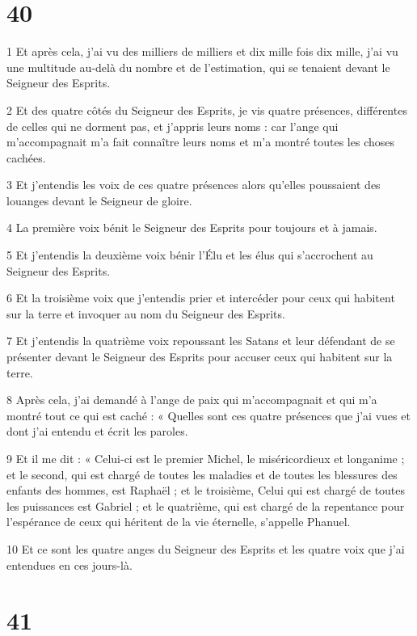 \chapter{40}

\par 1 Et après cela, j'ai vu des milliers de milliers et dix mille fois dix mille, j'ai vu une multitude au-delà du nombre et de l'estimation, qui se tenaient devant le Seigneur des Esprits.
\par 2 Et des quatre côtés du Seigneur des Esprits, je vis quatre présences, différentes de celles qui ne dorment pas, et j'appris leurs noms : car l'ange qui m'accompagnait m'a fait connaître leurs noms et m'a montré toutes les choses cachées.
\par 3 Et j'entendis les voix de ces quatre présences alors qu'elles poussaient des louanges devant le Seigneur de gloire.
\par 4 La première voix bénit le Seigneur des Esprits pour toujours et à jamais.
\par 5 Et j'entendis la deuxième voix bénir l'Élu et les élus qui s'accrochent au Seigneur des Esprits.
\par 6 Et la troisième voix que j'entendis prier et intercéder pour ceux qui habitent sur la terre et invoquer au nom du Seigneur des Esprits.
\par 7 Et j'entendis la quatrième voix repoussant les Satans et leur défendant de se présenter devant le Seigneur des Esprits pour accuser ceux qui habitent sur la terre.
\par 8 Après cela, j'ai demandé à l'ange de paix qui m'accompagnait et qui m'a montré tout ce qui est caché : « Quelles sont ces quatre présences que j'ai vues et dont j'ai entendu et écrit les paroles.
\par 9 Et il me dit : « Celui-ci est le premier Michel, le miséricordieux et longanime ; et le second, qui est chargé de toutes les maladies et de toutes les blessures des enfants des hommes, est Raphaël ; et le troisième, Celui qui est chargé de toutes les puissances est Gabriel ; et le quatrième, qui est chargé de la repentance pour l'espérance de ceux qui héritent de la vie éternelle, s'appelle Phanuel.
\par 10 Et ce sont les quatre anges du Seigneur des Esprits et les quatre voix que j'ai entendues en ces jours-là.

\chapter{41}

